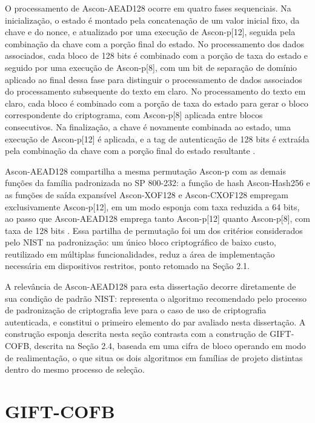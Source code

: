 O processamento de Ascon-AEAD128 ocorre em quatro fases sequenciais. Na inicialização, o estado é montado pela concatenação de um valor inicial fixo, da chave e do nonce, e atualizado por uma execução de Ascon-p[12], seguida pela combinação da chave com a porção final do estado. No processamento dos dados associados, cada bloco de 128 bits é combinado com a porção de taxa do estado e seguido por uma execução de Ascon-p[8], com um bit de separação de domínio aplicado ao final dessa fase para distinguir o processamento de dados associados do processamento subsequente do texto em claro. No processamento do texto em claro, cada bloco é combinado com a porção de taxa do estado para gerar o bloco correspondente do criptograma, com Ascon-p[8] aplicada entre blocos consecutivos. Na finalização, a chave é novamente combinada ao estado, uma execução de Ascon-p[12] é aplicada, e a tag de autenticação de 128 bits é extraída pela combinação da chave com a porção final do estado resultante \cite{nist_sp800232_2025}.

Ascon-AEAD128 compartilha a mesma permutação Ascon-p com as demais funções da família padronizada no SP 800-232: a função de hash Ascon-Hash256 e as funções de saída expansível Ascon-XOF128 e Ascon-CXOF128 empregam exclusivamente Ascon-p[12], em um modo esponja com taxa reduzida a 64 bits, ao passo que Ascon-AEAD128 emprega tanto Ascon-p[12] quanto Ascon-p[8], com taxa de 128 bits \cite{nist_sp800232_2025}. Essa partilha de permutação foi um dos critérios considerados pelo NIST na padronização: um único bloco criptográfico de baixo custo, reutilizado em múltiplas funcionalidades, reduz a área de implementação necessária em dispositivos restritos, ponto retomado na Seção 2.1.

A relevância de Ascon-AEAD128 para esta dissertação decorre diretamente de sua condição de padrão NIST: representa o algoritmo recomendado pelo processo de padronização de criptografia leve para o caso de uso de criptografia autenticada, e constitui o primeiro elemento do par avaliado nesta dissertação. A construção esponja descrita nesta seção contrasta com a construção de GIFT-COFB, descrita na Seção 2.4, baseada em uma cifra de bloco operando em modo de realimentação, o que situa os dois algoritmos em famílias de projeto distintas dentro do mesmo processo de seleção.


\section{GIFT-COFB}


